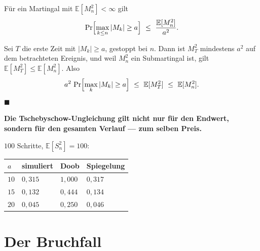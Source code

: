 \begin{merksatz}
Für ein Martingal mit $\mathbb{E}[M_n^{2}] < \infty$ gilt
\[ \Pr\Bigl[\max_{k \le n} |M_k| \ge a\Bigr] \ \le\ \frac{\mathbb{E}[M_n^{2}]}{a^{2}} . \]

Sei $T$ die erste Zeit mit $|M_k| \ge a$, gestoppt bei $n$. Dann ist $M_T^2$ mindestens $a^2$ auf dem betrachteten Ereignis, und weil $M_n^{2}$ ein Submartingal ist, gilt $\mathbb{E}[M_T^{2}] \le \mathbb{E}[M_n^{2}]$. Also
\[ a^{2}\,\Pr\Bigl[\max_k |M_k| \ge a\Bigr] \ \le\ \mathbb{E}[M_T^{2}] \ \le\ \mathbb{E}[M_n^{2}] . \]
$\blacksquare$

\begin{center}
\begin{minipage}{0.9\textwidth}
\textbf{Die Tschebyschow-Ungleichung gilt nicht nur für den Endwert, sondern für den gesamten Verlauf --- zum selben Preis.}
\end{minipage}
\end{center}

$100$ Schritte, $\mathbb{E}[S_n^2] = 100$:
\begin{center}
{\small
\renewcommand{\arraystretch}{1.48}
\begin{tabular}{@{}P{1.6cm}P{2.2cm}P{2.2cm}P{2.2cm}@{}}
\toprule
$a$ & \textbf{simuliert} & \textbf{Doob} & \textbf{Spiegelung}\\
\midrule
$10$ & $0{,}315$ & $1{,}000$ & $0{,}317$\\
$15$ & $0{,}132$ & $0{,}444$ & $0{,}134$\\
$20$ & $0{,}045$ & $0{,}250$ & $0{,}046$\\
\bottomrule
\end{tabular}}
\end{center}

\begin{center}
\begin{minipage}{0.88\textwidth}
\end{minipage}
\end{center}
\end{merksatz}

\section{Der Bruchfall}

